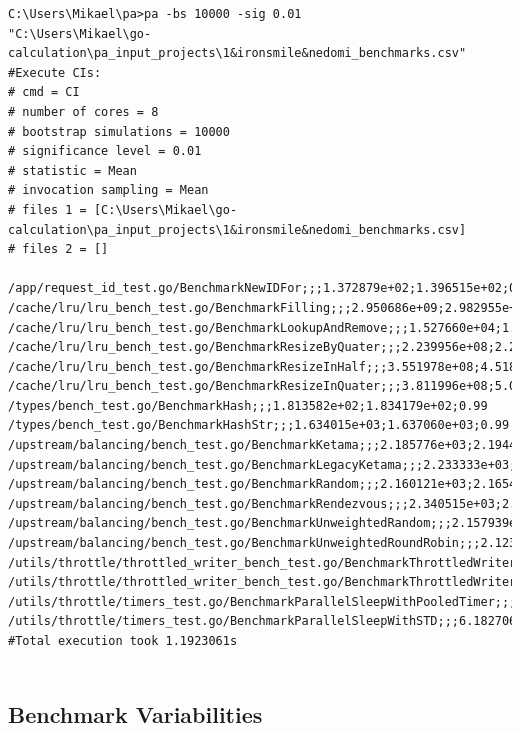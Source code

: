 \documentclass{seal_thesis}
\begin{document}
\begin{minipage}{\linewidth}

\begin{lstlisting}[caption=Example pa-tool results of \cite{ironsmile/nedomi}., label={lst:patool}, frame=single, breaklines=true, basicstyle=\small]
C:\Users\Mikael\pa>pa -bs 10000 -sig 0.01
"C:\Users\Mikael\go-calculation\pa_input_projects\1&ironsmile&nedomi_benchmarks.csv"
#Execute CIs:
# cmd = CI
# number of cores = 8
# bootstrap simulations = 10000
# significance level = 0.01
# statistic = Mean
# invocation sampling = Mean
# files 1 = [C:\Users\Mikael\go-calculation\pa_input_projects\1&ironsmile&nedomi_benchmarks.csv]
# files 2 = []

/app/request_id_test.go/BenchmarkNewIDFor;;;1.372879e+02;1.396515e+02;0.99
/cache/lru/lru_bench_test.go/BenchmarkFilling;;;2.950686e+09;2.982955e+09;0.99
/cache/lru/lru_bench_test.go/BenchmarkLookupAndRemove;;;1.527660e+04;1.532752e+04;0.99
/cache/lru/lru_bench_test.go/BenchmarkResizeByQuater;;;2.239956e+08;2.292164e+08;0.99
/cache/lru/lru_bench_test.go/BenchmarkResizeInHalf;;;3.551978e+08;4.518111e+08;0.99
/cache/lru/lru_bench_test.go/BenchmarkResizeInQuater;;;3.811996e+08;5.008146e+08;0.99
/types/bench_test.go/BenchmarkHash;;;1.813582e+02;1.834179e+02;0.99
/types/bench_test.go/BenchmarkHashStr;;;1.634015e+03;1.637060e+03;0.99
/upstream/balancing/bench_test.go/BenchmarkKetama;;;2.185776e+03;2.194403e+03;0.99
/upstream/balancing/bench_test.go/BenchmarkLegacyKetama;;;2.233333e+03;2.242545e+03;0.99
/upstream/balancing/bench_test.go/BenchmarkRandom;;;2.160121e+03;2.165439e+03;0.99
/upstream/balancing/bench_test.go/BenchmarkRendezvous;;;2.340515e+03;2.347833e+03;0.99
/upstream/balancing/bench_test.go/BenchmarkUnweightedRandom;;;2.157939e+03;2.164152e+03;0.99
/upstream/balancing/bench_test.go/BenchmarkUnweightedRoundRobin;;;2.123652e+03;2.130727e+03;0.99
/utils/throttle/throttled_writer_bench_test.go/BenchmarkThrottledWriter;;;4.030817e+09;4.036552e+09;0.99
/utils/throttle/throttled_writer_bench_test.go/BenchmarkThrottledWriterWithReadFrom;;;4.038926e+09;4.040731e+09;0.99
/utils/throttle/timers_test.go/BenchmarkParallelSleepWithPooledTimer;;;6.253588e+07;6.261951e+07;0.99
/utils/throttle/timers_test.go/BenchmarkParallelSleepWithSTD;;;6.182706e+07;6.191619e+07;0.99
#Total execution took 1.1923061s
	
\end{lstlisting}
\end{minipage}


\subsection{Benchmark Variabilities}
\label{Benchmark Variabilities}
\end{document}
